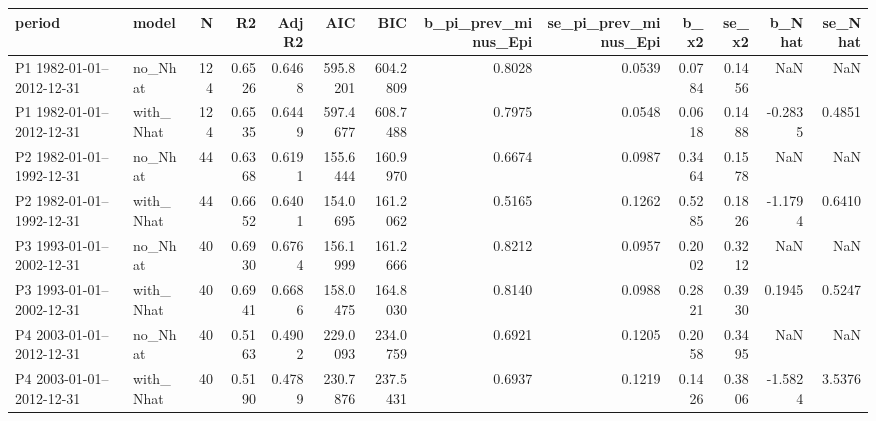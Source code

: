 \begin{tabular}{llrrrrrrrrrrr}
\toprule
period & model & N & R2 & AdjR2 & AIC & BIC & b_pi_prev_minus_Epi & se_pi_prev_minus_Epi & b_x2 & se_x2 & b_Nhat & se_Nhat \\
\midrule
P1 1982-01-01--2012-12-31 & no_Nhat & 124 & 0.6526 & 0.6468 & 595.8201 & 604.2809 & 0.8028 & 0.0539 & 0.0784 & 0.1456 & NaN & NaN \\
P1 1982-01-01--2012-12-31 & with_Nhat & 124 & 0.6535 & 0.6449 & 597.4677 & 608.7488 & 0.7975 & 0.0548 & 0.0618 & 0.1488 & -0.2835 & 0.4851 \\
P2 1982-01-01--1992-12-31 & no_Nhat & 44 & 0.6368 & 0.6191 & 155.6444 & 160.9970 & 0.6674 & 0.0987 & 0.3464 & 0.1578 & NaN & NaN \\
P2 1982-01-01--1992-12-31 & with_Nhat & 44 & 0.6652 & 0.6401 & 154.0695 & 161.2062 & 0.5165 & 0.1262 & 0.5285 & 0.1826 & -1.1794 & 0.6410 \\
P3 1993-01-01--2002-12-31 & no_Nhat & 40 & 0.6930 & 0.6764 & 156.1999 & 161.2666 & 0.8212 & 0.0957 & 0.2002 & 0.3212 & NaN & NaN \\
P3 1993-01-01--2002-12-31 & with_Nhat & 40 & 0.6941 & 0.6686 & 158.0475 & 164.8030 & 0.8140 & 0.0988 & 0.2821 & 0.3930 & 0.1945 & 0.5247 \\
P4 2003-01-01--2012-12-31 & no_Nhat & 40 & 0.5163 & 0.4902 & 229.0093 & 234.0759 & 0.6921 & 0.1205 & 0.2058 & 0.3495 & NaN & NaN \\
P4 2003-01-01--2012-12-31 & with_Nhat & 40 & 0.5190 & 0.4789 & 230.7876 & 237.5431 & 0.6937 & 0.1219 & 0.1426 & 0.3806 & -1.5824 & 3.5376 \\
\bottomrule
\end{tabular}
